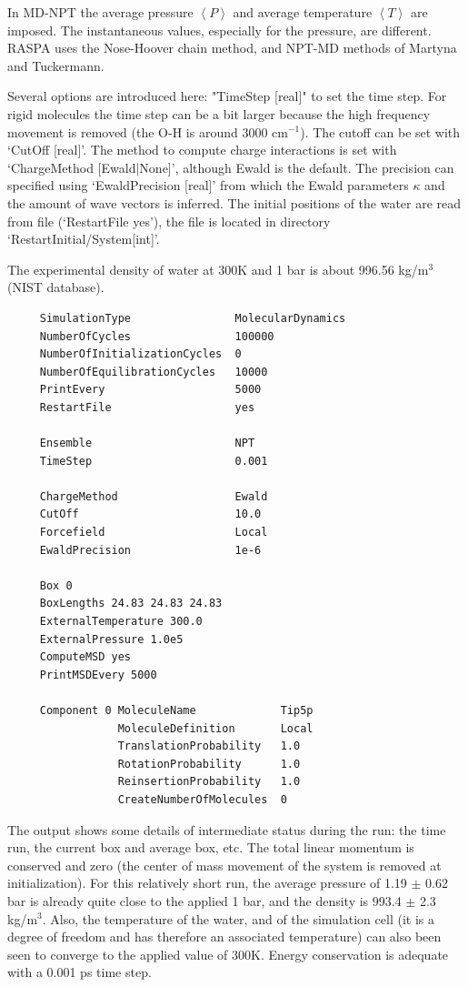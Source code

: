 In MD-NPT the average pressure 
$\left\langle P\right\rangle$ and average temperature $\left\langle T\right\rangle$ are imposed. The instantaneous
values, especially for the pressure, are different. RASPA uses the Nose-Hoover chain method, and NPT-MD methods of
Martyna and Tuckermann.

Several options are introduced here: "TimeStep [real]" to set the time step. For rigid molecules the time step can be a bit larger
because the high frequency movement is removed (the O-H is around 3000 cm$^{-1}$). The cutoff can be set with `CutOff [real]'.
The method to compute charge interactions is set with `ChargeMethod [Ewald$|$None]', although Ewald is the default. The precision can specified
using `EwaldPrecision [real]' from which the Ewald parameters $\kappa$ and the amount of wave vectors is inferred.
The initial positions of the water are read from file (`RestartFile yes'), the file is located in directory `RestartInitial/System[int]'.

The experimental density of water at 300K and 1 bar is about 996.56 kg/m$^3$ (NIST database).

\begin{tiny}
\begin{verbatim}
     SimulationType                MolecularDynamics
     NumberOfCycles                100000
     NumberOfInitializationCycles  0
     NumberOfEquilibrationCycles   10000
     PrintEvery                    5000
     RestartFile                   yes
     
     Ensemble                      NPT
     TimeStep                      0.001
     
     ChargeMethod                  Ewald
     CutOff                        10.0
     Forcefield                    Local
     EwaldPrecision                1e-6
     
     Box 0
     BoxLengths 24.83 24.83 24.83
     ExternalTemperature 300.0
     ExternalPressure 1.0e5
     ComputeMSD yes
     PrintMSDEvery 5000
     
     Component 0 MoleculeName             Tip5p
                 MoleculeDefinition       Local
                 TranslationProbability   1.0
                 RotationProbability      1.0
                 ReinsertionProbability   1.0
                 CreateNumberOfMolecules  0
\end{verbatim}
\end{tiny}

The output shows some details of intermediate status during the run: the time run, the current box and average box, etc.
The total linear momentum is conserved and zero (the center of mass movement of the system is removed at initialization).
For this relatively short run, the average pressure of 1.19 $\pm$ 0.62 bar is already quite close to the applied 1 bar,
and the density is 993.4 $\pm$ 2.3 kg/m$^3$.
Also, the temperature of the water, and of the simulation cell (it is a degree of freedom and has therefore an associated temperature)
can also been seen to converge to the applied value of 300K. Energy conservation is adequate with a 0.001 ps time step.

